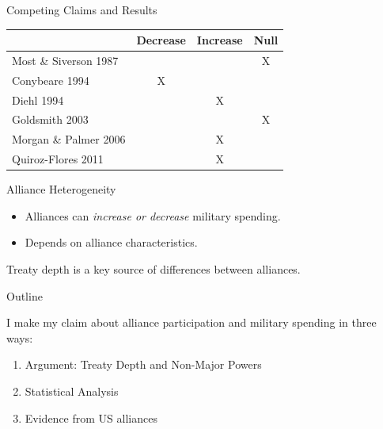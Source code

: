 \documentclass[12pt]{beamer}
\begin{document}

\begin{frame}{Competing Claims and Results}

\begin{table}[hbt!]
\begin{center}
\begin{tabular}{lccc}
     & Decrease & Increase & Null \\
\hline
Most \& Siverson 1987  &  &  & X \\
Conybeare 1994 & X & &  \\
Diehl 1994 &  & X &  \\
Goldsmith 2003 &  &  & X \\
Morgan \& Palmer 2006 &  & X & \\ 
Quiroz-Flores 2011 &  & X &  \\ 
\hline
\end{tabular}
\end{center} 
\end{table}


 \end{frame}




\begin{frame}{Alliance Heterogeneity}


\begin{itemize}
\item Alliances can \textit{increase or decrease} military spending. 
\pause
\item Depends on alliance characteristics. 
\end{itemize} 

\end{frame}

 \begin{frame}[standout]

Treaty depth is a key source of differences between alliances. 

 \end{frame}



\begin{frame}{Outline}

I make my claim about alliance participation and military spending in three ways: 

\pause
\begin{enumerate}
\item Argument: Treaty Depth and Non-Major Powers
\pause
\item Statistical Analysis
\pause
\item Evidence from US alliances
\end{enumerate}


\end{frame}
\end{document}
